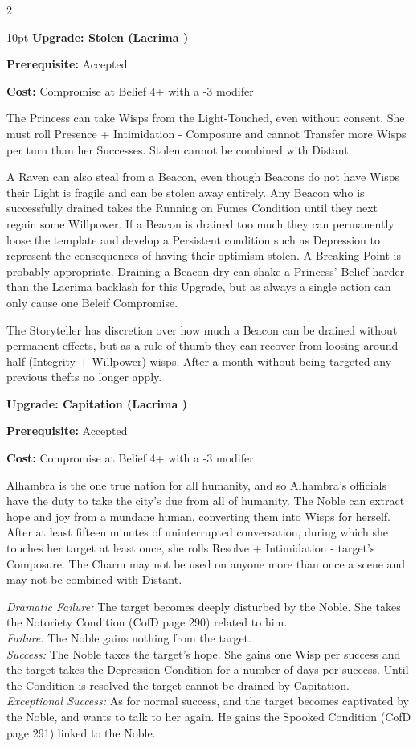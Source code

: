 \begin{multicols}{2}
\begin{myindentpar}{10pt}
\textbf{Upgrade: Stolen (Lacrima \textbullet\textbullet)}

\noindent \textbf{Prerequisite:} Accepted

\noindent \textbf{Cost:} Compromise at Belief 4+ with a -3 modifer

The Princess can take Wisps from the Light-Touched, even without consent. She must roll Presence + Intimidation - Composure and cannot Transfer more Wisps per turn than her Successes. Stolen cannot be combined with Distant. 

A Raven can also steal from a Beacon, even though Beacons do not have Wisps their Light is fragile and can be stolen away entirely. Any Beacon who is successfully drained takes the Running on Fumes Condition until they next regain some Willpower. If a Beacon is drained too much they can permanently loose the template and develop a Persistent condition such as Depression to represent the consequences of having their optimism stolen. A Breaking Point is probably appropriate. Draining a Beacon dry can shake a Princess' Belief harder than the Lacrima backlash for this Upgrade, but as always a single action can only cause one Beleif Compromise. 

The Storyteller has discretion over how much a Beacon can be drained without permanent effects, but as a rule of thumb they can recover from loosing around  half (Integrity + Willpower) wisps. After a month without being targeted any previous thefts no longer apply. 

\textbf{Upgrade: Capitation (Lacrima \textbullet\textbullet\textbullet)}

\noindent \textbf{Prerequisite:} Accepted

\noindent \textbf{Cost:} Compromise at Belief 4+ with a -3 modifer

Alhambra is the one true nation for all humanity, and so Alhambra's officials have the duty to take the city's due from all of humanity. The Noble can extract hope and joy from a
mundane human, converting them into Wisps for herself. After at least fifteen minutes of uninterrupted conversation, during which she touches her target at least once, she rolls Resolve + Intimidation - target’s Composure. The Charm may not be used on anyone more than once a scene and may not be combined with Distant.

\emph{Dramatic Failure:} The target becomes deeply disturbed by the Noble. She takes the Notoriety Condition (CofD page 290) related to him.\\
\emph{Failure:} The Noble gains nothing from the target.\\
\emph{Success:} The Noble taxes the target’s hope. She gains one Wisp per success and the target takes the Depression Condition for a number of days per success. Until the Condition is resolved the target cannot be drained by Capitation.\\ 
\emph{Exceptional Success:} As for normal success, and the target becomes captivated by the Noble, and wants to talk to her again. He gains the Spooked Condition (CofD page 291) linked to the Noble.


\end{myindentpar}
\end{multicols}
